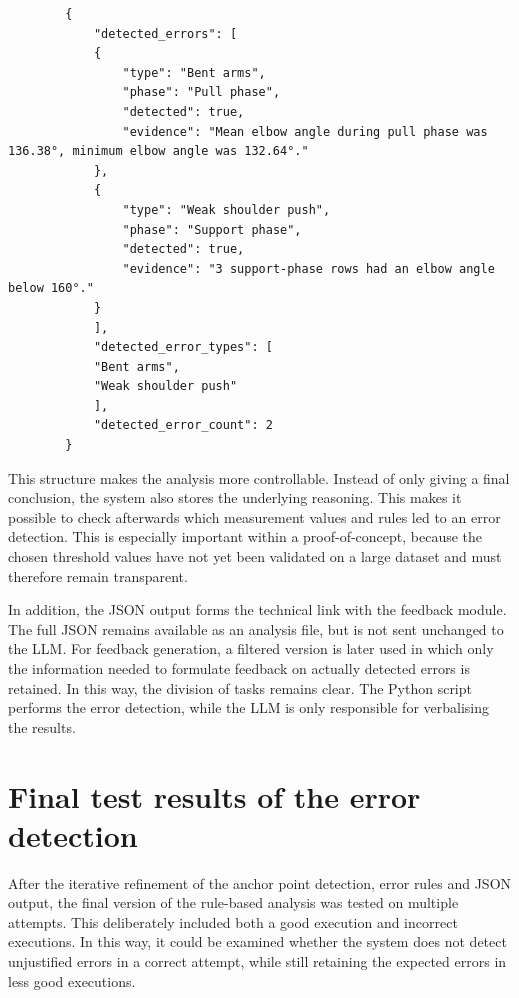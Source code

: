 \begin{listing}[H]
    \begin{verbatim}
        {
            "detected_errors": [
            {
                "type": "Bent arms",
                "phase": "Pull phase",
                "detected": true,
                "evidence": "Mean elbow angle during pull phase was 136.38°, minimum elbow angle was 132.64°."
            },
            {
                "type": "Weak shoulder push",
                "phase": "Support phase",
                "detected": true,
                "evidence": "3 support-phase rows had an elbow angle below 160°."
            }
            ],
            "detected_error_types": [
            "Bent arms",
            "Weak shoulder push"
            ],
            "detected_error_count": 2
        }
    \end{verbatim}
    \caption{Shortened example of the detected errors in the JSON output from \href{https://github.com/Tristanvanspeybroeck/bachelorproef-Methodologie-25-26-Van-Speybroeck-Tristan/blob/main/Methodologie/pose_project/data/V2/json/Bad_kip1_analysis_result_V2.json}{Bad\_kip1\_analysis\_result\_V2.json} (video: Bad\_kip1)}
    \label{lst:json_detected_errors}
\end{listing}

This structure makes the analysis more controllable. Instead of only giving a final conclusion, the system also stores the underlying reasoning. This makes it possible to check afterwards which measurement values and rules led to an error detection. This is especially important within a proof-of-concept, because the chosen threshold values have not yet been validated on a large dataset and must therefore remain transparent.

In addition, the JSON output forms the technical link with the feedback module. The full JSON remains available as an analysis file, but is not sent unchanged to the LLM. For feedback generation, a filtered version is later used in which only the information needed to formulate feedback on actually detected errors is retained. In this way, the division of tasks remains clear. The Python script performs the error detection, while the LLM is only responsible for verbalising the results.

\section{Final test results of the error detection}

After the iterative refinement of the anchor point detection, error rules and JSON output, the final version of the rule-based analysis was tested on multiple attempts. This deliberately included both a good execution and incorrect executions. In this way, it could be examined whether the system does not detect unjustified errors in a correct attempt, while still retaining the expected errors in less good executions.

